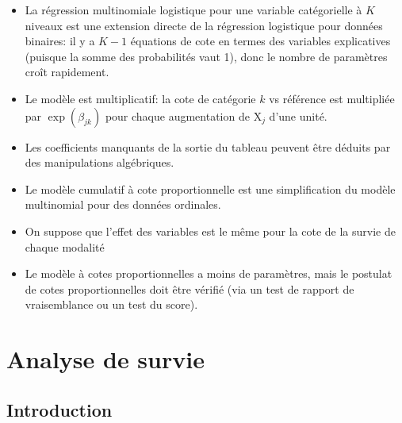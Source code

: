 \documentclass[
  11pt,
  letterpaper,
]{scrbook}
\providecommand{\tightlist}{%
  \setlength{\itemsep}{0pt}\setlength{\parskip}{0pt}}\usepackage{longtable,booktabs,array}
\theoremstyle{definition}
\theoremstyle{remark}
\begin{document}
\begin{tcolorbox}[enhanced jigsaw, coltitle=black, left=2mm, opacitybacktitle=0.6, colback=white, leftrule=.75mm, colframe=quarto-callout-note-color-frame, toprule=.15mm, colbacktitle=quarto-callout-note-color!10!white, opacityback=0, bottomtitle=1mm, toptitle=1mm, rightrule=.15mm, title=\textcolor{quarto-callout-note-color}{\faInfo}\hspace{0.5em}{En résumé}, breakable, titlerule=0mm, arc=.35mm, bottomrule=.15mm]

\begin{itemize}
\tightlist
\item
  La régression multinomiale logistique pour une variable catégorielle à
  \(K\) niveaux est une extension directe de la régression logistique
  pour données binaires: il y a \(K-1\) équations de cote en termes des
  variables explicatives (puisque la somme des probabilités vaut 1),
  donc le nombre de paramètres croît rapidement.
\item
  Le modèle est multiplicatif: la cote de catégorie \(k\) vs référence
  est multipliée par \(\exp(\beta_{jk})\) pour chaque augmentation de
  \(\mathrm{X}_j\) d'une unité.
\item
  Les coefficients manquants de la sortie du tableau peuvent être
  déduits par des manipulations algébriques.
\item
  Le modèle cumulatif à cote proportionnelle est une simplification du
  modèle multinomial pour des données ordinales.
\item
  On suppose que l'effet des variables est le même pour la cote de la
  survie de chaque modalité
\item
  Le modèle à cotes proportionnelles a moins de paramètres, mais le
  postulat de cotes proportionnelles doit être vérifié (via un test de
  rapport de vraisemblance ou un test du score).
\end{itemize}

\end{tcolorbox}


\chapter{Analyse de survie}\label{analyse-survie}

\section{Introduction}\label{introduction-2}
\end{document}

